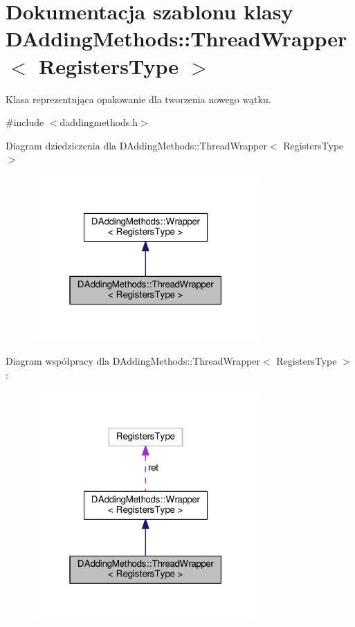 \hypertarget{class_d_adding_methods_1_1_thread_wrapper}{\section{Dokumentacja szablonu klasy D\-Adding\-Methods\-:\-:Thread\-Wrapper$<$ Registers\-Type $>$}
\label{class_d_adding_methods_1_1_thread_wrapper}
}


Klasa reprezentująca opakowanie dla tworzenia nowego wątku.  




{\ttfamily \#include $<$daddingmethods.\-h$>$}



Diagram dziedziczenia dla D\-Adding\-Methods\-:\-:Thread\-Wrapper$<$ Registers\-Type $>$
\nopagebreak
\begin{figure}[H]
\begin{center}
\leavevmode
\includegraphics[width=244pt]{class_d_adding_methods_1_1_thread_wrapper__inherit__graph}
\end{center}
\end{figure}


Diagram współpracy dla D\-Adding\-Methods\-:\-:Thread\-Wrapper$<$ Registers\-Type $>$\-:
\nopagebreak
\begin{figure}[H]
\begin{center}
\leavevmode
\includegraphics[width=244pt]{class_d_adding_methods_1_1_thread_wrapper__coll__graph}
\end{center}
\end{figure}
